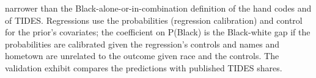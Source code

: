{narrower than the Black-alone-or-in-combination definition of the hand codes and of TIDES. Regressions use the probabilities (regression calibration) and control for the prior's covariates; the coefficient on P(Black) is the Black-white gap if the probabilities are calibrated given the regression's controls and names and hometown are unrelated to the outcome given race and the controls. The validation exhibit compares the predictions with published TIDES shares.
\par}

